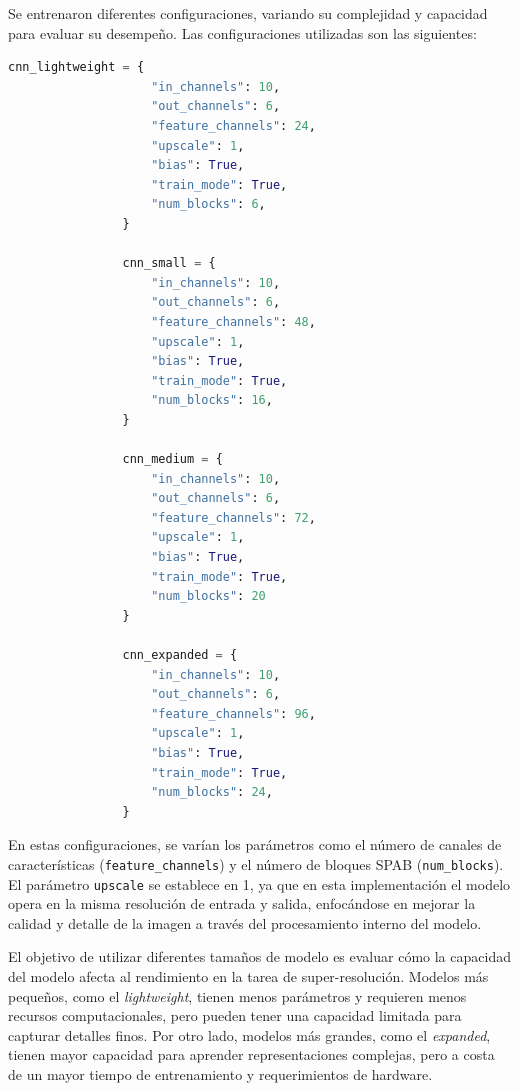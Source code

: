             Se entrenaron diferentes configuraciones, variando su complejidad y capacidad para evaluar su desempeño. Las configuraciones utilizadas son las siguientes:

            \begin{lstlisting}[language=Python]
                cnn_lightweight = {
                    "in_channels": 10,
                    "out_channels": 6,
                    "feature_channels": 24,
                    "upscale": 1,
                    "bias": True,
                    "train_mode": True,
                    "num_blocks": 6,
                }
                
                cnn_small = {
                    "in_channels": 10,
                    "out_channels": 6,
                    "feature_channels": 48,
                    "upscale": 1,
                    "bias": True,
                    "train_mode": True,
                    "num_blocks": 16,
                }
                
                cnn_medium = {
                    "in_channels": 10,
                    "out_channels": 6,
                    "feature_channels": 72,
                    "upscale": 1,
                    "bias": True,
                    "train_mode": True,
                    "num_blocks": 20
                }
                
                cnn_expanded = {
                    "in_channels": 10,
                    "out_channels": 6,
                    "feature_channels": 96,
                    "upscale": 1,
                    "bias": True,
                    "train_mode": True,
                    "num_blocks": 24,
                }
            \end{lstlisting}


            En estas configuraciones, se varían los parámetros como el número de canales de características (\texttt{feature\_channels}) y el número de bloques SPAB (\texttt{num\_blocks}). El parámetro \texttt{upscale} se establece en 1, ya que en esta implementación el modelo opera en la misma resolución de entrada y salida, enfocándose en mejorar la calidad y detalle de la imagen a través del procesamiento interno del modelo.

            El objetivo de utilizar diferentes tamaños de modelo es evaluar cómo la capacidad del modelo afecta al rendimiento en la tarea de super-resolución. Modelos más pequeños, como el \textit{lightweight}, tienen menos parámetros y requieren menos recursos computacionales, pero pueden tener una capacidad limitada para capturar detalles finos. Por otro lado, modelos más grandes, como el \textit{expanded}, tienen mayor capacidad para aprender representaciones complejas, pero a costa de un mayor tiempo de entrenamiento y requerimientos de hardware.

